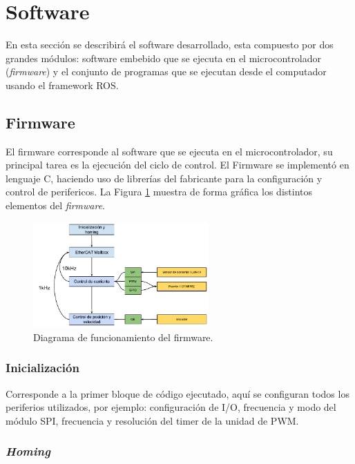 \section{Software}

En esta sección se describirá el software desarrollado, esta compuesto por dos grandes módulos: software embebido que se ejecuta en el microcontrolador (\textit{firmware}) y el conjunto de programas que se ejecutan desde el computador usando el framework ROS.

\subsection{Firmware}

El firmware corresponde al software que se ejecuta en el microcontrolador, su principal tarea es la ejecución del ciclo de control. El Firmware se implementó en lenguaje C, haciendo uso de librerías del fabricante para la configuración y control de perifericos. La Figura \ref{cap4_scorbot_firmware} muestra de forma gráfica los distintos elementos del \textit{firmware}.

\begin{figure}[ht]
  \centering
  \includegraphics[width=0.6\textwidth]{img/cap4/scorbot_firmware.pdf}
  \caption{Diagrama de funcionamiento del firmware.}
  \label{cap4_scorbot_firmware}
\end{figure}


\subsubsection{Inicialización}

Corresponde a la primer bloque de código ejecutado, aquí se configuran todos los periferios utilizados, por ejemplo: configuración de I/O, frecuencia y modo del módulo SPI, frecuencia y resolución del timer de la unidad de PWM.

\subsubsection{\textit{Homing}}

